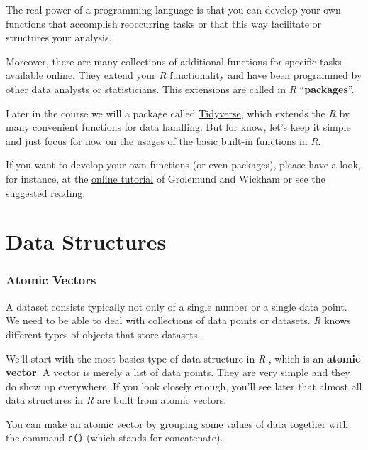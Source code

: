 \documentclass[
]{scrartcl}
\makeatletter
\newenvironment{kframe}{%
\medskip{}
\setlength{\fboxsep}{.8em}
 \def\at@end@of@kframe{}%
 \ifinner\ifhmode%
  \def\at@end@of@kframe{\end{minipage}}%
  \begin{minipage}{\columnwidth}%
 \fi\fi%
 \def\FrameCommand##1{\hskip\@totalleftmargin \hskip-\fboxsep
 \colorbox{shadecolor}{##1}\hskip-\fboxsep
     \hskip-\linewidth \hskip-\@totalleftmargin \hskip\columnwidth}%
 \MakeFramed {\advance\hsize-\width
   \@totalleftmargin\z@ \linewidth\hsize
   \@setminipage}}%
 {\par\unskip\endMakeFramed%
 \at@end@of@kframe}
\newenvironment{rmdblock}[1]
  {
  \begin{itemize}
  \renewcommand{\labelitemi}{
    \raisebox{-.7\height}[0pt][0pt]{
      {\setkeys{Gin}{width=3em,keepaspectratio}\texttt{[image: images/\#1]}}
    }
  }
  \setlength{\fboxsep}{1em}
  \begin{kframe}
  \item
  }
  {
  \end{kframe}
  \end{itemize}
  }
\newenvironment{geek}
    {\begin{rmdblock}{geek}}
    {\end{rmdblock}}
\makeatother
\begin{document}
The real power of a programming language is that you can develop your own functions that accomplish reoccurring tasks or that this way facilitate or structures your analysis.

Moreover, there are many collections of additional functions for specific tasks available online. They extend your \emph{R} functionality and have been programmed by other data analysts or statisticians. This extensions are called in \emph{R} ``\textbf{packages}''.

Later in the course we will a package called \href{https://www.tidyverse.org/}{Tidyverse}, which extends the \emph{R} by many convenient functions for data handling. But for know, let's keep it simple and just focus for now on the usages of the basic built-in functions in \emph{R}.

\begin{geek}
If you want to develop your own functions (or even packages), please
have a look, for instance, at the
\href{https://r4ds.had.co.nz/functions.html}{online tutorial} of
Grolemund and Wickham or see the \protect\hyperlink{readings}{suggested
reading}.
\end{geek}

\newpage

\hypertarget{part-data-structures}{%
\part{Data Structures}\label{part-data-structures}}

\hypertarget{vectors}{%
\section{Atomic Vectors}\label{vectors}}

A dataset consists typically not only of a single number or a single data point. We need to be able to deal with collections of data points or datasets. \emph{R} knows different types of objects that store datasets.

We'll start with the most basics type of data structure in \emph{R} , which is an \textbf{atomic vector}. A vector is merely a list of data points. They are very simple and they do show up everywhere. If you look closely enough, you'll see later that almost all data structures in \emph{R} are built from atomic vectors.

You can make an atomic vector by grouping some values of data together with the command \texttt{c()} (which stands for concatenate).
\end{document}
